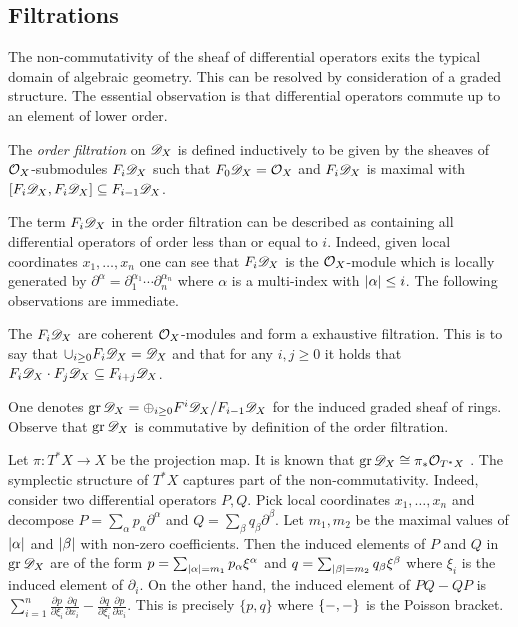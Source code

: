 \subsection{Filtrations}
The non-commutativity of the sheaf of differential operators exits the typical domain of algebraic geometry.
This can be resolved by consideration of a graded structure.
The essential observation is that differential operators commute up to an element of lower order.
\begin{definition}
  The {\it order filtration} on $\mathscr{D}_X$ is defined inductively to be given by the sheaves of $\mathcal{O}_X$-submodules $F_i \mathscr{D}_X$ such that $F_0\mathscr{D}_X = \mathcal{O}_X$ and $F_i\mathscr{D}_X$ is maximal with $[F_i\mathscr{D}_X, F_i \mathscr{D}_X] \subseteq F_{i-1}\mathscr{D}_X$.
\end{definition}
The term $F_i \mathscr{D}_X$ in the order filtration can be described as containing all differential operators of order less than or equal to $i$.
Indeed, given local coordinates $x_1,\ldots, x_n$ one can see that $F_i\mathscr{D}_X$ is the $\mathcal{O}_X$-module which is locally generated by $\partial^\alpha = \partial_1^{\alpha_1}\cdots \partial_n^{\alpha_n}$ where $\alpha$ is a multi-index with $\vert \alpha \vert\leq i$.
The following observations are immediate.
\begin{lemma}
  The $F_i\mathscr{D}_X$ are coherent $\mathcal{O}_X$-modules and form a exhaustive filtration. This is to say that $\cup_{i\geq 0}F_i\mathscr{D}_X = \mathscr{D}_X$
  and that for any $i,j\geq 0$ it holds that $F_i\mathscr{D}_X \cdot F_j \mathscr{D}_X \subseteq F_{i+j}\mathscr{D}_X$.
\end{lemma}
One denotes $\operatorname{gr} \mathscr{D}_X = \oplus_{i\geq 0}F^i\mathscr{D}_X/F_{i-1}\mathscr{D}_X$ for the induced graded sheaf of rings.
Observe that $\operatorname{gr}\mathscr{D}_X$ is commutative by definition of the order filtration.

Let $\pi:T^*X \to X$ be the projection map.
It is known that $\operatorname{gr}\mathscr{D}_X \cong \pi_*\mathcal{O}_{T^*X}$ \cite[Section 2.1]{hotta2007d}.
The symplectic structure of $T^* X$ captures part of the non-commutativity.
Indeed, consider two differential operators $P, Q$.
Pick local coordinates $x_1,\ldots, x_n$ and decompose $P = \sum_{\alpha} p_\alpha \partial^\alpha $ and $Q = \sum_{\beta} q_\beta \partial^\beta$.
Let $m_1,m_2$ be the maximal values of $\vert \alpha \vert$ and $\vert \beta \vert$ with non-zero coefficients.
Then the induced elements of $P$ and $Q$ in $\operatorname{gr} \mathscr{D}_X$ are of the form $p = \sum_{\vert \alpha \vert = m_1} p_\alpha \xi^\alpha$ and $q = \sum_{\vert \beta \vert = m_2}q_\beta \xi^\beta $ where $\xi_i$ is the induced element of $\partial_i$.
On the other hand, the induced element of $PQ - QP$ is $\sum_{i=1}^n\frac{\partial p}{\partial \xi_i}\frac{\partial q}{\partial x_i} - \frac{\partial q}{\partial \xi_i}\frac{\partial p}{\partial x_i}$.
This is precisely $\{p,q\}$ where $\{{-},{-}\}$ is the Poisson bracket.


